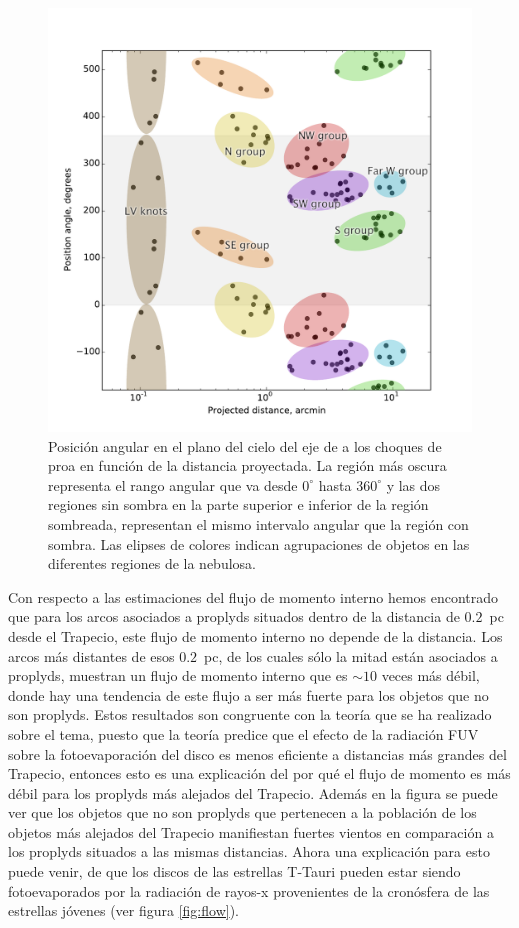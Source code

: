 \begin{figure}
  \centering
  \includegraphics[width=\linewidth, clip]{arc-classify}
  \caption{Posición angular en el plano del cielo del eje de \thC{} a los choques de proa en función de la distancia proyectada. La región más oscura representa el rango angular que va desde \(0^{\circ}\) hasta \(360^{\circ}\) y las dos regiones sin sombra en la parte superior e inferior de la región sombreada, representan el mismo intervalo angular que la región con sombra. Las elipses de colores indican agrupaciones de objetos en las diferentes regiones de la nebulosa. }
 \label{fig:town}
\end{figure}

Con respecto a las estimaciones del flujo de momento interno hemos encontrado que para los arcos asociados a proplyds situados dentro de la distancia de \(0.2\)~pc desde el Trapecio, este flujo de momento interno no depende de la distancia. Los arcos más distantes de esos \(0.2\)~pc, de los cuales sólo la mitad están asociados a proplyds, muestran un flujo de momento interno que es \(\sim 10\) veces más débil, donde hay una tendencia de este flujo a ser más fuerte para los objetos que no son proplyds. Estos resultados son congruente con la teoría que se ha realizado sobre el tema, puesto que la teoría predice que el efecto de la radiación FUV sobre la fotoevaporación del disco es menos eficiente a distancias más grandes del Trapecio, entonces esto es una explicación del por qué el flujo de momento es más débil para los proplyds más alejados del Trapecio. Además en la figura se puede ver que los objetos que no son proplyds que pertenecen a la población de los objetos más alejados del Trapecio manifiestan fuertes vientos en comparación a los proplyds situados a las mismas distancias. Ahora una explicación para esto puede venir, de que los discos de las estrellas T-Tauri pueden estar siendo fotoevaporados por la radiación de rayos-x provenientes de la cronósfera de las estrellas jóvenes (ver figura \ref{fig:flow}). \\

